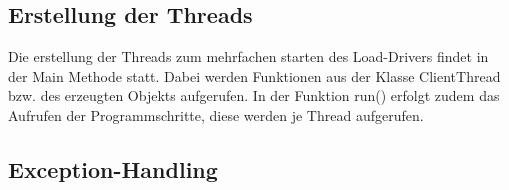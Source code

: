 \subsection{Erstellung der Threads}

Die erstellung der Threads zum mehrfachen starten des Load-Drivers findet in der
Main Methode statt. Dabei werden Funktionen aus der Klasse ClientThread bzw.
des erzeugten Objekts aufgerufen. In der Funktion run() erfolgt zudem das
Aufrufen der Programmschritte, diese werden je Thread aufgerufen.

\subsection{Exception-Handling}


\clearpage